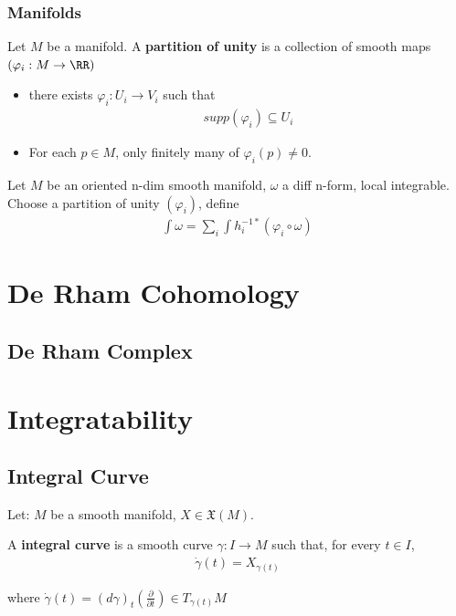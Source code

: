 \documentclass[Total.tex]{subfiles}
\begin{document}
		\subsection{Manifolds}
		\begin{Def}
			Let $M$ be a manifold. A \textbf{partition of unity} is a collection of smooth maps $(\varphi_i:M\rightarrow \RR)$ 
			\begin{itemize}
				\item there exists $\varphi_i:U_i\rightarrow V_i$ such that
				\begin{gather*}
					supp(\varphi_i)\subseteq U_i
				\end{gather*}
				
				\item For each $p\in M$, only finitely many of $\varphi_i(p)\not=0$.
			\end{itemize}
		\end{Def}
		\begin{Def}
			Let $M$ be an oriented n-dim smooth manifold, $\omega$ a diff n-form, local integrable. Choose a partition of unity $(\varphi_i)$, define
			\begin{gather*}
				\int \omega=\sum_i \int h_i^{-1*}(\varphi_i\circ\omega) 
			\end{gather*}
		\end{Def}
	\chapter{De Rham Cohomology}
		\section{De Rham Complex}
	\chapter{Integratability}
		\section{Integral Curve}
			\begin{Def}
				Let: $M$ be a smooth manifold, $X\in \mathfrak{X}(M)$. 
				
				A \textbf{integral curve} is a smooth curve $\gamma:I\rightarrow M$ such that, for every $t\in I$,
				\begin{gather*}
					\dot{\gamma}(t)=X_{\gamma(t)}
				\end{gather*}
				
				where $\dot{\gamma}(t)=(d\gamma)_t(\frac{\partial}{\partial t})\in T_{\gamma(t)}M$
			\end{Def}
			
\end{document}
